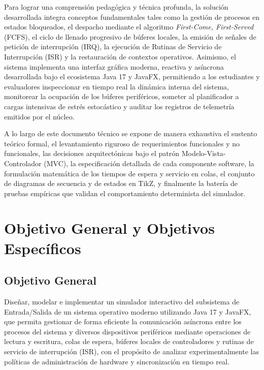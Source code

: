 \documentclass[11pt,letterpaper]{article}
\begin{document}
Para lograr una comprensión pedagógica y técnica profunda, la solución desarrollada integra conceptos fundamentales tales como la gestión de procesos en estados bloqueados, el despacho mediante el algoritmo \textit{First-Come, First-Served} (FCFS), el ciclo de llenado progresivo de búferes locales, la emisión de señales de petición de interrupción (IRQ), la ejecución de Rutinas de Servicio de Interrupción (ISR) y la restauración de contextos operativos. Asimismo, el sistema implementa una interfaz gráfica moderna, reactiva y asíncrona desarrollada bajo el ecosistema Java 17 y JavaFX, permitiendo a los estudiantes y evaluadores inspeccionar en tiempo real la dinámica interna del sistema, monitorear la ocupación de los búferes periféricos, someter al planificador a cargas intensivas de estrés estocástico y auditar los registros de telemetría emitidos por el núcleo.

A lo largo de este documento técnico se expone de manera exhaustiva el sustento teórico formal, el levantamiento riguroso de requerimientos funcionales y no funcionales, las decisiones arquitectónicas bajo el patrón Modelo-Vista-Controlador (MVC), la especificación detallada de cada componente software, la formulación matemática de los tiempos de espera y servicio en colas, el conjunto de diagramas de secuencia y de estados en \textsf{TikZ}, y finalmente la batería de pruebas empíricas que validan el comportamiento determinista del simulador.

\section{Objetivo General y Objetivos Específicos}

\subsection{Objetivo General}
Diseñar, modelar e implementar un simulador interactivo del subsistema de Entrada/Salida de un sistema operativo moderno utilizando Java 17 y JavaFX, que permita gestionar de forma eficiente la comunicación asíncrona entre los procesos del sistema y diversos dispositivos periféricos mediante operaciones de lectura y escritura, colas de espera, búferes locales de controladores y rutinas de servicio de interrupción (ISR), con el propósito de analizar experimentalmente las políticas de administración de hardware y sincronización en tiempo real.
\end{document}
